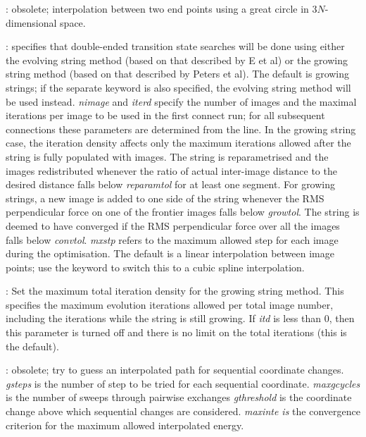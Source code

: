 {{: obsolete;
interpolation between two end points using a great circle in $3N$-dimensional
space.

:
  specifies that double-ended transition state searches will be done using
  either the evolving string method (based on that described by E et
  al\cite{ERV02}) or the growing string method (based on that described by
  Peters et al\cite{PetersHBC04}). The default is growing strings; if the
  separate keyword  is also specified, the evolving string
  method will be used instead. {\it nimage\/} and {\it iterd\/} specify the
  number of images and the maximal iterations per image to be used in the
  first connect run; for all subsequent connections these parameters are
  determined from the  line. In the growing string case, the
  iteration density affects only the maximum iterations allowed after the
  string is fully populated with images. The string is reparametrised and the
  images redistributed whenever the ratio of actual inter-image distance to
  the desired distance falls below {\it reparamtol\/} for at least one
  segment.  For growing strings, a new image is added to one side of the
  string whenever the RMS perpendicular force on one of the frontier images
  falls below {\it growtol\/}. The string is deemed to have converged if the
  RMS perpendicular force over all the images falls below {\it convtol\/}.
  {\it mxstp\/} refers to the maximum allowed step for each image during the
  optimisation. The default is a linear interpolation between image points;
  use the {} keyword to switch this to a cubic spline interpolation.

: Set the maximum total iteration density for the
  growing string method. This specifies the maximum evolution iterations allowed per
  total image number, including the iterations while the string is still
  growing. If {\it itd\/} is less than 0, then this parameter is turned off
  and there is no limit on the total iterations (this is the default).

:
obsolete;
try to guess an interpolated path for sequential coordinate changes.
{\it gsteps\/} is the number of step to be tried for each sequential coordinate.
{\it maxgcycles\/} is the number of sweeps through pairwise exchanges
{\it gthreshold\/} is the coordinate change above which sequential changes are considered.
{\it maxinte is\/} the convergence criterion for the maximum allowed interpolated energy.

}}

